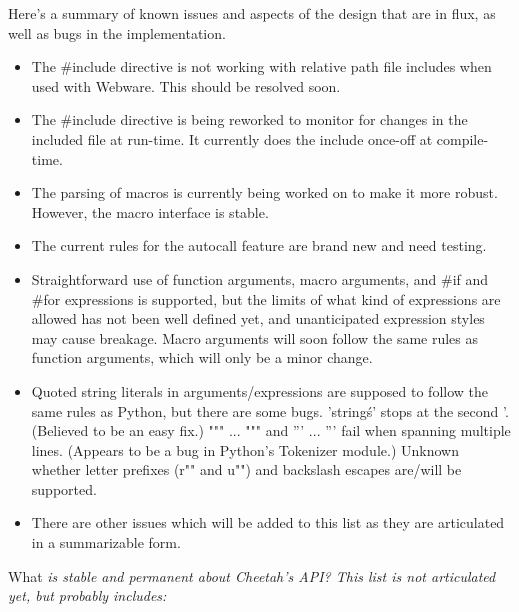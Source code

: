 Here's a summary of known issues and aspects of the design that are in flux,
as well as bugs in the implementation.

\begin{itemize}

\item The \#include directive is not working with relative path file includes
     when used with Webware. This should be resolved soon.

\item The \#include directive is being reworked to monitor for changes in the
     included file at run-time. It currently does the include once-off at
     compile-time.

\item The parsing of macros is currently being worked on to make it more
     robust.  However, the macro interface is stable.

\item The current rules for the autocall feature are brand new and need
     testing.

\item Straightforward use of function arguments, macro arguments, and
     #if and #for expressions is supported, but the limits of what kind of
     expressions are allowed has not been well defined yet, and unanticipated
     expression styles may cause breakage.  Macro arguments will soon follow
     the same rules as function arguments, which will only be a minor change.

\item Quoted string literals in arguments/expressions are supposed to follow
     the same rules as Python, but there are some bugs.  
     'string\'s' stops at the second '.  (Believed to be an easy fix.)
     """ ... """ and ''' ... ''' fail when spanning multiple lines.
     (Appears to be a bug in Python's Tokenizer module.)
     Unknown whether letter prefixes (r"" and u"") and backslash escapes
     are/will be supported.

\item There are other issues which will be added to this list as they are
     articulated in a summarizable form.

\end{itemize}

What \em{is} stable and permanent about Cheetah's API?  This list is not
articulated yet, but probably includes:

